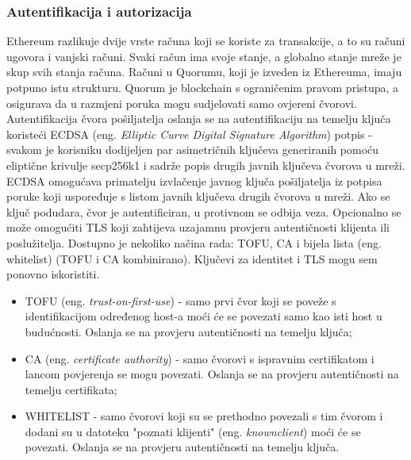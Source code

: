 \documentclass[times, utf8, diplomski]{fer}
\begin{document}
\subsubsection{Autentifikacija i autorizacija}
Ethereum razlikuje dvije vrste računa koji se koriste za transakcije, a to su računi ugovora i vanjski računi. Svaki račun ima svoje stanje, a globalno stanje mreže je skup svih stanja računa.  Računi u Quorumu, koji je izveden iz Ethereuma, imaju potpuno istu strukturu. Quorum je blockchain s ograničenim pravom pristupa, a osigurava da u razmjeni poruka mogu sudjelovati samo ovjereni čvorovi. Autentifikacija čvora pošiljatelja oslanja se na autentifikaciju na temelju ključa koristeći ECDSA (eng. \textit{Elliptic Curve Digital Signature Algorithm}) potpis - svakom je korisniku dodijeljen par asimetričnih ključeva generiranih pomoću eliptične krivulje secp256k1 i sadrže popis drugih javnih ključeva čvorova u mreži.  \cite{johnson2001elliptic} ECDSA omogućava primatelju izvlačenje javnog ključa pošiljatelja iz potpisa poruke koji uspoređuje s listom javnih ključeva drugih čvorova u mreži. Ako se ključ podudara, čvor je autentificiran, u protivnom se odbija veza. Opcionalno se može omogućiti TLS koji zahtijeva uzajamnu provjeru autentičnosti klijenta ili poslužitelja. Dostupno je nekoliko načina rada: TOFU, CA i bijela lista (eng. whitelist) (TOFU i CA kombinirano). Ključevi za identitet i TLS mogu sem ponovno iskoristiti. \cite{lagarde2019security}

\begin{itemize}

\item TOFU (eng.  \textit{trust-on-first-use}) - samo prvi čvor koji se poveže s identifikacijom određenog host-a moći će se povezati samo kao isti host u budućnosti. Oslanja se na provjeru autentičnosti na temelju ključa;

\item CA (eng.  \textit{certificate authority}) - samo čvorovi s ispravnim certifikatom i lancom povjerenja se mogu povezati. Oslanja se na provjeru autentičnosti na temelju certifikata;

\item WHITELIST - samo čvorovi koji su se prethodno povezali s tim čvorom i dodani su u datoteku "poznati klijenti" (eng.  \textit{knownclient}) moći će se povezati.  Oslanja se na provjeru autentičnosti na temelju ključa. \cite{valenta2017comparison}

\end{itemize}
\end{document}
